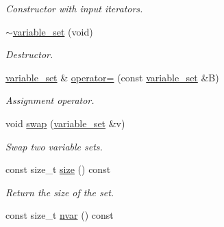 \begin{DoxyCompactItemize}
\begin{DoxyCompactList}\small\item\em Constructor with input iterators. \end{DoxyCompactList}\item 
\hyperlink{classmerlin_1_1variable__set_a13807826d3d4b0c175bda457287f1e52}{$\sim$variable\+\_\+set} (void)\hypertarget{classmerlin_1_1variable__set_a13807826d3d4b0c175bda457287f1e52}{}\label{classmerlin_1_1variable__set_a13807826d3d4b0c175bda457287f1e52}

\begin{DoxyCompactList}\small\item\em Destructor. \end{DoxyCompactList}\item 
\hyperlink{classmerlin_1_1variable__set}{variable\+\_\+set} \& \hyperlink{classmerlin_1_1variable__set_a5f36dc1ce299f11257f629b35b8a3906}{operator=} (const \hyperlink{classmerlin_1_1variable__set}{variable\+\_\+set} \&B)\hypertarget{classmerlin_1_1variable__set_a5f36dc1ce299f11257f629b35b8a3906}{}\label{classmerlin_1_1variable__set_a5f36dc1ce299f11257f629b35b8a3906}

\begin{DoxyCompactList}\small\item\em Assignment operator. \end{DoxyCompactList}\item 
void \hyperlink{classmerlin_1_1variable__set_af22f5cc1ecd470d78e74dbe4ec34014e}{swap} (\hyperlink{classmerlin_1_1variable__set}{variable\+\_\+set} \&v)\hypertarget{classmerlin_1_1variable__set_af22f5cc1ecd470d78e74dbe4ec34014e}{}\label{classmerlin_1_1variable__set_af22f5cc1ecd470d78e74dbe4ec34014e}

\begin{DoxyCompactList}\small\item\em Swap two variable sets. \end{DoxyCompactList}\item 
const size\+\_\+t \hyperlink{classmerlin_1_1variable__set_aa73f5eb2ec21a678121254234d92ca9c}{size} () const \hypertarget{classmerlin_1_1variable__set_aa73f5eb2ec21a678121254234d92ca9c}{}\label{classmerlin_1_1variable__set_aa73f5eb2ec21a678121254234d92ca9c}

\begin{DoxyCompactList}\small\item\em Return the size of the set. \end{DoxyCompactList}\item 
const size\+\_\+t \hyperlink{classmerlin_1_1variable__set_a738c52ab39d0746a6fb71d558564f00e}{nvar} () const \hypertarget{classmerlin_1_1variable__set_a738c52ab39d0746a6fb71d558564f00e}{}\label{classmerlin_1_1variable__set_a738c52ab39d0746a6fb71d558564f00e}


\end{DoxyCompactItemize}
